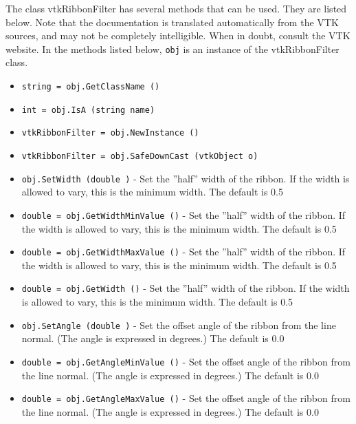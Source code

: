 The class vtkRibbonFilter has several methods that can be used.
  They are listed below.
Note that the documentation is translated automatically from the VTK sources,
and may not be completely intelligible.  When in doubt, consult the VTK website.
In the methods listed below, \verb|obj| is an instance of the vtkRibbonFilter class.
\begin{itemize}
\item  \verb|string = obj.GetClassName ()|

\item  \verb|int = obj.IsA (string name)|

\item  \verb|vtkRibbonFilter = obj.NewInstance ()|

\item  \verb|vtkRibbonFilter = obj.SafeDownCast (vtkObject o)|

\item  \verb|obj.SetWidth (double )| -  Set the ''half'' width of the ribbon. If the width is allowed to vary, 
 this is the minimum width. The default is 0.5

\item  \verb|double = obj.GetWidthMinValue ()| -  Set the ''half'' width of the ribbon. If the width is allowed to vary, 
 this is the minimum width. The default is 0.5

\item  \verb|double = obj.GetWidthMaxValue ()| -  Set the ''half'' width of the ribbon. If the width is allowed to vary, 
 this is the minimum width. The default is 0.5

\item  \verb|double = obj.GetWidth ()| -  Set the ''half'' width of the ribbon. If the width is allowed to vary, 
 this is the minimum width. The default is 0.5

\item  \verb|obj.SetAngle (double )| -  Set the offset angle of the ribbon from the line normal. (The angle
 is expressed in degrees.) The default is 0.0

\item  \verb|double = obj.GetAngleMinValue ()| -  Set the offset angle of the ribbon from the line normal. (The angle
 is expressed in degrees.) The default is 0.0

\item  \verb|double = obj.GetAngleMaxValue ()| -  Set the offset angle of the ribbon from the line normal. (The angle
 is expressed in degrees.) The default is 0.0


\end{itemize}
